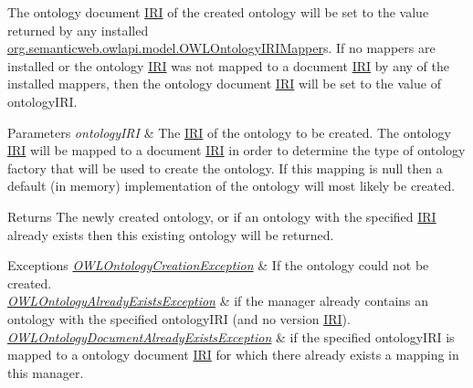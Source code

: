The ontology document \hyperlink{classorg_1_1semanticweb_1_1owlapi_1_1model_1_1_i_r_i}{I\-R\-I} of the created ontology will be set to the value returned by any installed \hyperlink{interfaceorg_1_1semanticweb_1_1owlapi_1_1model_1_1_o_w_l_ontology_i_r_i_mapper}{org.\-semanticweb.\-owlapi.\-model.\-O\-W\-L\-Ontology\-I\-R\-I\-Mapper}s. If no mappers are installed or the ontology \hyperlink{classorg_1_1semanticweb_1_1owlapi_1_1model_1_1_i_r_i}{I\-R\-I} was not mapped to a document \hyperlink{classorg_1_1semanticweb_1_1owlapi_1_1model_1_1_i_r_i}{I\-R\-I} by any of the installed mappers, then the ontology document \hyperlink{classorg_1_1semanticweb_1_1owlapi_1_1model_1_1_i_r_i}{I\-R\-I} will be set to the value of {\ttfamily ontology\-I\-R\-I}. 
\begin{DoxyParams}{Parameters}
{\em ontology\-I\-R\-I} & The \hyperlink{classorg_1_1semanticweb_1_1owlapi_1_1model_1_1_i_r_i}{I\-R\-I} of the ontology to be created. The ontology \hyperlink{classorg_1_1semanticweb_1_1owlapi_1_1model_1_1_i_r_i}{I\-R\-I} will be mapped to a document \hyperlink{classorg_1_1semanticweb_1_1owlapi_1_1model_1_1_i_r_i}{I\-R\-I} in order to determine the type of ontology factory that will be used to create the ontology. If this mapping is {\ttfamily null} then a default (in memory) implementation of the ontology will most likely be created. \\
\hline
\end{DoxyParams}
\begin{DoxyReturn}{Returns}
The newly created ontology, or if an ontology with the specified \hyperlink{classorg_1_1semanticweb_1_1owlapi_1_1model_1_1_i_r_i}{I\-R\-I} already exists then this existing ontology will be returned. 
\end{DoxyReturn}

\begin{DoxyExceptions}{Exceptions}
{\em \hyperlink{classorg_1_1semanticweb_1_1owlapi_1_1model_1_1_o_w_l_ontology_creation_exception}{O\-W\-L\-Ontology\-Creation\-Exception}} & If the ontology could not be created. \\
\hline
{\em \hyperlink{classorg_1_1semanticweb_1_1owlapi_1_1model_1_1_o_w_l_ontology_already_exists_exception}{O\-W\-L\-Ontology\-Already\-Exists\-Exception}} & if the manager already contains an ontology with the specified {\ttfamily ontology\-I\-R\-I} (and no version \hyperlink{classorg_1_1semanticweb_1_1owlapi_1_1model_1_1_i_r_i}{I\-R\-I}). \\
\hline
{\em \hyperlink{classorg_1_1semanticweb_1_1owlapi_1_1model_1_1_o_w_l_ontology_document_already_exists_exception}{O\-W\-L\-Ontology\-Document\-Already\-Exists\-Exception}} & if the specified {\ttfamily ontology\-I\-R\-I} is mapped to a ontology document \hyperlink{classorg_1_1semanticweb_1_1owlapi_1_1model_1_1_i_r_i}{I\-R\-I} for which there already exists a mapping in this manager. \\
\hline
\end{DoxyExceptions}


